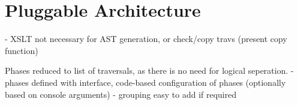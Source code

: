 \documentclass[twoside,openright]{uva-bachelor-thesis}
\begin{document}

	
				
	\section{Pluggable Architecture}
		- XSLT not necessary for AST generation, or check/copy travs (present copy function)
		
		Phases reduced to list of traversals, as there is no need for logical seperation.
		- phases defined with interface, code-based configuration of phases (optionally based on console arguments)
		- grouping easy to add if required
	
\end{document}
